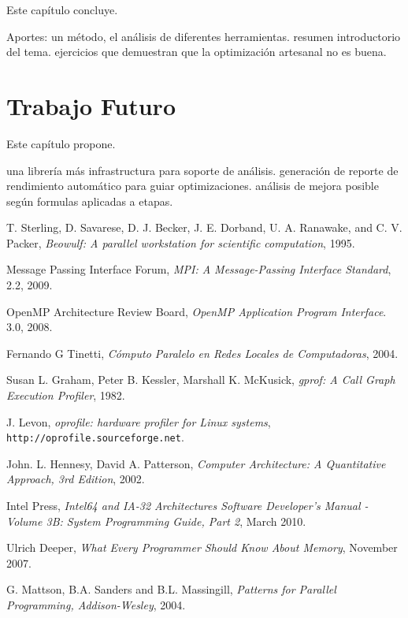 \documentclass[a4paper]{report}
\begin{document}
Este cap\'itulo concluye.

Aportes: un m\'etodo, el an\'alisis de diferentes herramientas. resumen
introductorio del tema. ejercicios que demuestran que la optimizaci\'on artesanal
no es buena.

\chapter{Trabajo Futuro}

Este cap\'itulo propone.

una librer\'ia m\'as infrastructura para soporte de an\'alisis.
generaci\'on de reporte de rendimiento autom\'atico para guiar optimizaciones.
an\'alisis de mejora posible seg\'un formulas aplicadas a etapas.

\begin{thebibliography}{9}

 T. Sterling, D. Savarese, D. J. Becker, J. E. Dorband, U. A. Ranawake, and C. V. Packer,
 \emph{Beowulf: A parallel workstation for scientific computation},
 1995.

  Message Passing Interface Forum,
  \emph{MPI: A Message-Passing Interface Standard},
  2.2,
  2009.

  OpenMP Architecture Review Board,
  \emph{OpenMP Application Program Interface}.
  3.0,
  2008.

  Fernando G Tinetti,
  \emph{C\'omputo Paralelo en Redes Locales de Computadoras},
  2004.

 Susan L. Graham,  Peter B. Kessler,  Marshall K. McKusick,
 \emph{gprof: A Call Graph Execution Profiler},
 1982.

J. Levon,
\emph{oprofile: hardware profiler for Linux systems},
{\tt http://oprofile.sourceforge.net}.

 John. L. Hennesy, David A. Patterson,
 \emph{Computer Architecture: A Quantitative Approach, 3rd Edition},
 2002.

 Intel Press,
 \emph{Intel64 and IA-32 Architectures Software Developer's Manual - Volume 3B: System Programming Guide, Part 2},
 March 2010.

 Ulrich Deeper,
 \emph{What Every Programmer Should Know About Memory},
 November 2007.

 G. Mattson, B.A. Sanders and B.L. Massingill, 
 \emph{Patterns for Parallel Programming, Addison-Wesley},
 2004.


\end{thebibliography}
\end{document}
